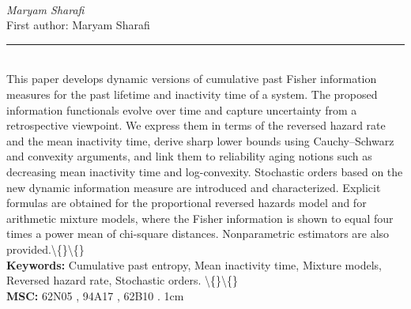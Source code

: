 \documentclass[10pt,twoside]{article}
\begin{document}
\noindent\begin{minipage}[t][\textheight]{\textwidth}
\\[0.35em]
{\itshape Maryam Sharafi}\\[0.2em]
{\footnotesize First author: Maryam Sharafi}\\[0.45em]
\noindent\rule{\textwidth}{0.3pt}\\[0.4em]
{\footnotesize  This paper develops dynamic versions of cumulative past Fisher information measures for the past lifetime and inactivity time of a system. The proposed information functionals evolve over time and capture uncertainty from a retrospective viewpoint. We express them in terms of the reversed hazard rate and the mean inactivity time, derive sharp lower bounds using Cauchy--Schwarz and convexity arguments, and link them to reliability aging notions such as decreasing mean inactivity time and log-convexity. Stochastic orders based on the new dynamic information measure are introduced and characterized. Explicit formulas are obtained for the proportional reversed hazards model and for arithmetic mixture models, where the Fisher information is shown to equal four times a power mean of chi-square distances. Nonparametric estimators are also provided.\textbackslash\{\}\textbackslash\{\}}\\[0.4em]
{\footnotesize\bfseries Keywords:} {\footnotesize Cumulative past entropy, Mean inactivity time, Mixture models, Reversed hazard rate, Stochastic orders. \textbackslash\{\}\textbackslash\{\}}\\[0.15em]
{\footnotesize\bfseries MSC:} {\footnotesize 62N05 , 94A17 , 62B10 . 1cm}\\
\vfill
\end{minipage}
\newpage
\end{document}
